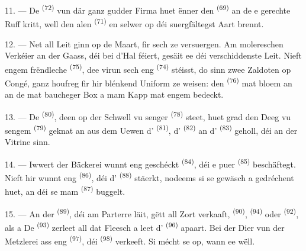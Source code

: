 11. --- De  \textsuperscript{(72)} vun där ganz gudder Firma huet
ënner den  \textsuperscript{(69)} an de 
e gerechte Ruff kritt, well den alen  \textsuperscript{(71)} en
selwer op déi suergfältegst Aart brennt.

\VUsaut{4.0mm}
\VUsaut{3.0mm}

12. --- Net all Leit ginn op de Maart, fir sech ze versuergen. Am molereschen
Verkéier an der Gaass, déi bei d'Hal féiert, gesäit ee déi verschiddenste Leit.
Nieft engem frëndleche  \textsuperscript{(75)}, dee virun sech
eng  \textsuperscript{(74)} stéisst, do sinn zwee Zaldoten op
Congé, ganz houfreg fir hir blénkend Uniform ze weisen: den 
\textsuperscript{(76)} mat bloem  an  an
de  mat baucheger Box a mam Kapp mat engem 
bedeckt.

13. --- De  \textsuperscript{(80)}, deen op der Schwell vu senger
 \textsuperscript{(78)} steet, huet grad den Deeg vu sengem
 \textsuperscript{(79)} geknat an aus dem Uewen d'
\textsuperscript{(81)}, d' \textsuperscript{(82)} an
d' \textsuperscript{(83)} geholl, déi an der Vitrine sinn.

14. --- Iwwert der Bäckerei wunnt eng geschéckt 
\textsuperscript{(84)}, déi e puer  \textsuperscript{(85)}
beschäftegt. Nieft hir wunnt eng  \textsuperscript{(86)}, déi
d' \textsuperscript{(88)} stäerkt, nodeems si se gewäsch a gedréchent
huet, an déi se mam  \textsuperscript{(87)} buggelt.

\VUsaut{4.0mm}
\VUsaut{3.0mm}

15. --- An der  \textsuperscript{(89)}, déi am Parterre läit, gëtt
all Zort  verkaaft,  \textsuperscript{(90)},
 \textsuperscript{(94)} oder 
\textsuperscript{(92)}, als  a
 De  \textsuperscript{(93)} zerleet all dat
Fleesch a leet d' \textsuperscript{(96)} apaart. Bei der Dier
vun der Metzlerei ass eng  \textsuperscript{(97)}, déi
 \textsuperscript{(98)} verkeeft. Si mécht se op, wann ee wëll.

